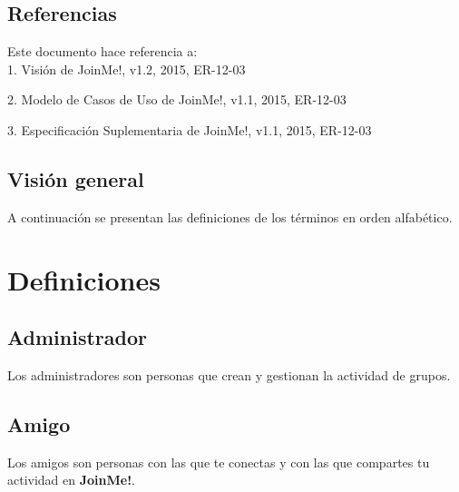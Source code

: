 \documentclass[12pt, a4paper, titlepage]{article}
\begin{document}
\subsection{Referencias}

Este documento hace referencia a:\\

1. Visión de JoinMe!, v1.2, 2015, ER-12-03

2. Modelo de Casos de Uso de JoinMe!, v1.1, 2015, ER-12-03

3. Especificación Suplementaria de JoinMe!, v1.1, 2015, ER-12-03

\subsection{Visión general}

A continuación se presentan las definiciones de los términos en orden alfabético.

\section{Definiciones}

\subsection{Administrador}

Los administradores son personas que crean y gestionan la actividad de grupos.

\subsection{Amigo}

Los amigos son personas con las que te conectas y con las que compartes tu actividad en \textbf{JoinMe!}.

\end{document}
